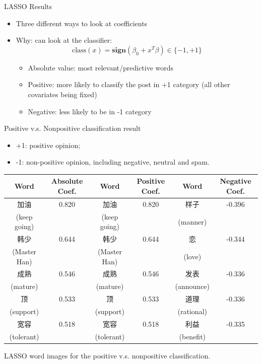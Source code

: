 \documentclass[12pt, trans]{beamer}
\newcommand{\1}[1]{{\mathbf 1}\left\{#1\right\}}        %
\begin{document}
\begin{frame}{LASSO Results} 

\begin{itemize}[<+->]
\item Three different ways to look at coefficients
\item Why: can look at the classifier:
\[
\text{class}(x) = \textbf{sign}(\beta_0+x^T\beta)\in\{-1,+1\}
\]
	\begin{itemize}
	\item Absolute value: most relevant/predictive words
	\item Positive: more likely to classify the post in +1 category (all other covariates being fixed)
	\item Negative: less likely to be in -1 category	
	\end{itemize}
	
\end{itemize}

\end{frame}



\begin{frame}{Positive v.s. Nonpositive classification result}

\begin{itemize}[<+->]
\item +1: positive opinion;
\item -1: non-positive opinion, including negative, neutral and spam.
\end{itemize}

\tiny
\begin{center}
\begin{tabular}{|c|c||c|c||c|c|}
\hline
Word & Absolute Coef. & Word & Positive Coef. & Word & Negative Coef.\\ \hline \hline
加油 & 0.820 & 加油 & 0.820 & 样子 & -0.396\\
(keep going) & & (keep going) & & (manner) & \\\hline
韩少 & 0.644 & 韩少 & 0.644 & 恋 & -0.344\\
(Master Han) & & (Master Han) & & (love) & \\\hline
成熟 & 0.546 & 成熟 & 0.546 & 发表 & -0.336\\
(mature) & & (mature) & & (announce) & \\\hline
顶 & 0.533 & 顶 & 0.533 & 道理 & -0.336\\
(support) & & (support) & & (rational) & \\\hline
宽容 & 0.518 & 宽容 & 0.518 & 利益 & -0.335\\
(tolerant) & & (tolerant) & & (benefit) & \\\hline
\end{tabular}
LASSO word images for the positive v.s. nonpositive classification.
\end{center}


\end{frame}
\end{document}
